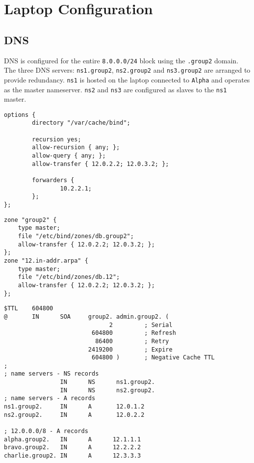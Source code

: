 \documentclass{report}
\begin{document}
\chapter{Laptop Configuration}
\section{DNS}
DNS is configured for the entire \texttt{8.0.0.0/24} block using the 
\texttt{.group2} domain. The three DNS servers: \texttt{ns1.group2}, \texttt
{ns2.group2} and \texttt{ns3.group2} are arranged to provide redundancy. \texttt
{ns1} is hosted on the laptop connected to \texttt{Alpha} and operates as the
master nameserver. \texttt{ns2} and \texttt{ns3} are configured as slaves to the
\texttt{ns1} master.
\begin{lstlisting}[caption={Master \texttt{named.conf.options}},label=
{listing:master-dns-named-conf-options}]
options {
        directory "/var/cache/bind";

        recursion yes;
        allow-recursion { any; };
        allow-query { any; };
        allow-transfer { 12.0.2.2; 12.0.3.2; };

        forwarders {
                10.2.2.1;
        };
};
\end{lstlisting}
\begin{lstlisting}[caption={Master \texttt{named.conf.local}},label=
{listing:master-dns-named-conf-local}]
zone "group2" {
    type master;
    file "/etc/bind/zones/db.group2";
    allow-transfer { 12.0.2.2; 12.0.3.2; };
};
zone "12.in-addr.arpa" {
    type master;
    file "/etc/bind/zones/db.12";
    allow-transfer { 12.0.2.2; 12.0.3.2; };
};
\end{lstlisting}
\begin{lstlisting}[caption={Master \texttt{db.group2}, for forward DNS},label=
{listing:master-dns-db-group2}]
$TTL    604800
@       IN      SOA     group2. admin.group2. (
                              2         ; Serial
                         604800         ; Refresh
                          86400         ; Retry
                        2419200         ; Expire
                         604800 )       ; Negative Cache TTL
;
; name servers - NS records
                IN      NS      ns1.group2.
                IN      NS      ns2.group2.
; name servers - A records
ns1.group2.     IN      A       12.0.1.2
ns2.group2.     IN      A       12.0.2.2

; 12.0.0.0/8 - A records
alpha.group2.   IN      A      12.1.1.1
bravo.group2.   IN      A      12.2.2.2
charlie.group2. IN      A      12.3.3.3
\end{lstlisting}
\end{document}
